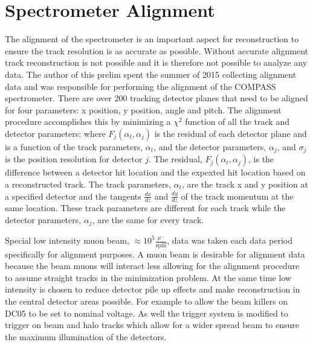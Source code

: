 \chapter{Spectrometer Alignment} 
The alignment of the spectrometer is an important aspect for
reconstruction to ensure the track resolution is as accurate as
possible.  Without accurate alignment track reconstruction is not
possible and it is therefore not possible to analyze any data.  The
author of this prelim spent the summer of 2015 collecting alignment
data and was responsible for performing the alignment of the COMPASS
spectrometer.  There are over 200 tracking detector planes that need
to be aligned for four parameters: x position, y position, angle and
pitch.  The alignment procedure accomplishes this by minimizing a
$\chi^2$ function of all the track and detector parameters:
%
%
where $F_j(\alpha_t, \alpha_j)$ is the residual of each detector plane
and is a function of the track parameters, $\alpha_t$, and the
detector parameters, $\alpha_j$, and $\sigma_j$ is the position
resolution for detector $j$. The residual, $F_j(\alpha_t, \alpha_j)$,
is the difference between a detector hit location and the expexted hit
location based on a reconstructed track.  The track parameters,
$\alpha_t$, are the track x and y position at a specified detector and
the tangents $\frac{dx}{dz}$ and $\frac{dy}{dz}$ of the track momentum
at the same location.  These track parameters are different for each
track while the detector parameters, $\alpha_j$,
are the same for every track.  \par

Special low intensity muon beam, $\approx 10^5 \frac{\mu
  ^-}{\mathrm{spill}}$, data was taken each data period specifically
for alignment purposes.  A muon beam is desirable for alignment data
because the beam muons will interact less allowing for the alignment
procedure to assume straight tracks in the minimization problem.  At
the same time low intensity is chosen to reduce detector pile up
effects and make reconstruction in the central detector areas
possible.  For example to allow the beam killers on DC05 to be set to
nominal voltage.  As well the trigger system is modified to trigger on
beam and halo tracks which allow for a wider spread
beam to ensure the maximum illumination of the detectors.  \par

